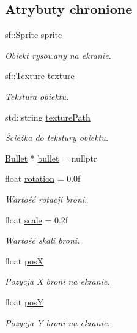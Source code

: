 \subsection*{Atrybuty chronione}
\begin{DoxyCompactItemize}
\item 
sf\+::\+Sprite \mbox{\hyperlink{class_weapon_ad56c11bff999e073bf880d482d54e06b}{sprite}}
\begin{DoxyCompactList}\small\item\em Obiekt rysowany na ekranie. \end{DoxyCompactList}\item 
sf\+::\+Texture \mbox{\hyperlink{class_weapon_a57095692a0468a109bba97fbd8c25db5}{texture}}
\begin{DoxyCompactList}\small\item\em Tekstura obiektu. \end{DoxyCompactList}\item 
std\+::string \mbox{\hyperlink{class_weapon_a340a6850f1bbf30d874aede653c249a9}{texture\+Path}}
\begin{DoxyCompactList}\small\item\em Ścieżka do tekstury obiektu. \end{DoxyCompactList}\item 
\mbox{\hyperlink{class_bullet}{Bullet}} $\ast$ \mbox{\hyperlink{class_weapon_a799874e40f4d2235ffa259eb46674fe5}{bullet}} = nullptr
\item 
float \mbox{\hyperlink{class_weapon_aea591386a659ecf7dd7e41ada97db990}{rotation}} = 0.\+0f
\begin{DoxyCompactList}\small\item\em Wartość rotacji broni. \end{DoxyCompactList}\item 
float \mbox{\hyperlink{class_weapon_a425a9f9fc4bb9bf0e4de80855d3e2ac0}{scale}} = 0.\+2f
\begin{DoxyCompactList}\small\item\em Wartość skali broni. \end{DoxyCompactList}\item 
float \mbox{\hyperlink{class_weapon_a977cf65797ba61f2b8cba78a6cd6adfa}{posX}}
\begin{DoxyCompactList}\small\item\em Pozycja X broni na ekranie. \end{DoxyCompactList}\item 
float \mbox{\hyperlink{class_weapon_a17ab9aa81f8c4476b43a8f71cd93a994}{posY}}
\begin{DoxyCompactList}\small\item\em Pozycja Y broni na ekranie. \end{DoxyCompactList}\item 

\end{DoxyCompactItemize}
